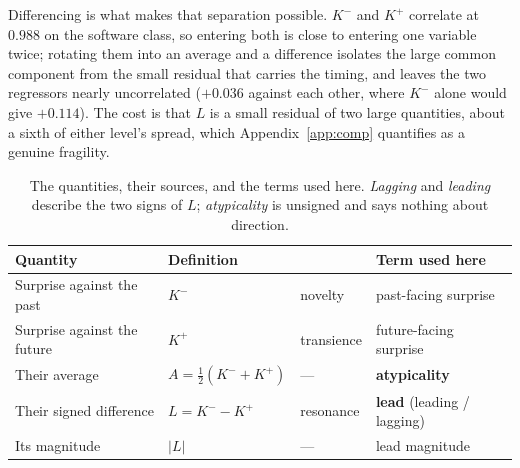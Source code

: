 Differencing is what makes that separation possible. $K^{-}$ and $K^{+}$
correlate at $0.988$ on the software class, so entering both is close to
entering one variable twice; rotating them into an average and a difference
isolates the large common component from the small residual that carries the
timing, and leaves the two regressors nearly uncorrelated ($+0.036$ against
each other, where $K^{-}$ alone would give $+0.114$). The cost is that $L$ is
a small residual of two large quantities, about a sixth of either level's
spread, which Appendix~\ref{app:comp} quantifies as a genuine fragility.

\begin{table}[h]\centering\small
\caption{The quantities, their sources, and the terms used here. \emph{Lagging}
and \emph{leading} describe the two signs of $L$; \emph{atypicality} is
unsigned and says nothing about direction.}
\label{tab:constructs}
\begin{tabular}{llll}
\toprule
Quantity & Definition & \citeauthor{Murdock2017} & Term used here \\
\midrule
Surprise against the past   & $K^{-}$                        & novelty    & past-facing surprise \\
Surprise against the future & $K^{+}$                        & transience & future-facing surprise \\
Their average               & $A = \tfrac{1}{2}(K^{-}+K^{+})$ & ---        & \textbf{atypicality} \\
Their signed difference     & $L = K^{-}-K^{+}$              & resonance  & \textbf{lead} (leading / lagging) \\
Its magnitude               & $|L|$                          & ---        & lead magnitude \\
\bottomrule
\end{tabular}
\end{table}

